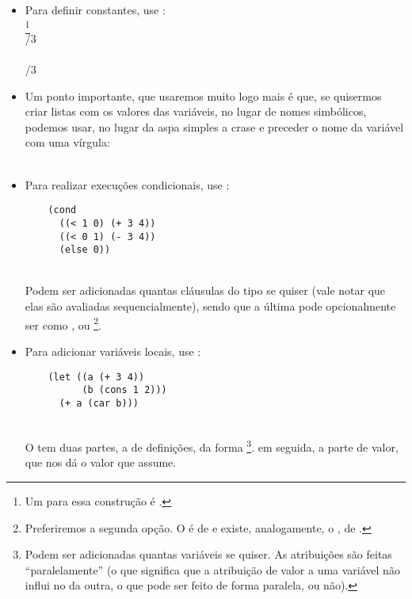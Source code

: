 \begin{itemize}
\item Para definir constantes, use :\\
  \footnote{Um
     para essa construção é
    .}\\
   /3\\
  \\
   /3

\item  Um ponto importante, que usaremos muito logo mais é que, se
  quisermos criar listas com os valores das variáveis, no lugar de
  nomes simbólicos, podemos usar, no lugar da aspa simples a crase e
  preceder o nome da variável com uma vírgula:\\
  \\
   \seta {}

\item Para realizar execuções condicionais, use :\\
  \begin{lstlisting}
    (cond
      ((< 1 0) (+ 3 4))
      ((< 0 1) (- 3 4))
      (else 0))
  \end{lstlisting}
  \hspace{1cm} \\
  
  Podem ser adicionadas quantas cláusulas do tipo
   se quiser (vale notar que elas são
  avaliadas sequencialmente), sendo que a última pode
  opcionalmente ser como , ou \footnote{Preferiremos a segunda opção. O
     é de  e existe, analogamente, o
    , de .}.

\item Para adicionar variáveis locais, use :
  \begin{lstlisting}
    (let ((a (+ 3 4))
          (b (cons 1 2)))
      (+ a (car b)))
  \end{lstlisting}
  \hspace{1cm} \\
  O  tem duas partes, a de definições, da forma
  \footnote{Podem ser adicionadas quantas variáveis se
    quiser. As atribuições são feitas ``paralelamente'' (o que
    significa que a atribuição de valor a uma variável não influi no
    da outra, o que pode ser feito de forma paralela, ou não).}.
  em seguida, a parte de valor, que nos dá o valor que 
  assume.  
\end{itemize}

